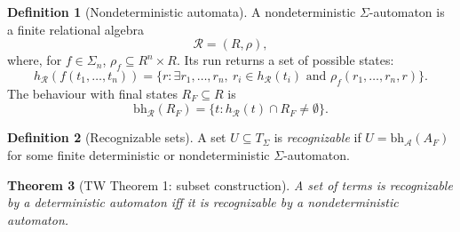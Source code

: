 \documentclass[11pt]{article}
\newtheorem{theorem}{Theorem}
\theoremstyle{definition}
\newtheorem{definition}[theorem]{Definition}
\newcommand{\SigmaSym}{\Sigma}
\newcommand{\Term}[1]{T_{#1}}
\newcommand{\Aut}{\mathcal A}
\newcommand{\NAut}{\mathcal R}
\newcommand{\bh}{\mathrm{bh}}
\begin{document}
\begin{definition}[Nondeterministic automata]
A nondeterministic \(\SigmaSym\)-automaton is a finite relational algebra
\[
  \NAut=(R,\rho),
\]
where, for \(f\in\SigmaSym_n\), \(\rho_f\subseteq R^n\times R\).  Its run returns
a set of possible states:
\[
  h_\NAut(f(t_1,\ldots,t_n))
  =
  \{r:\exists r_1,\ldots,r_n,\ r_i\in h_\NAut(t_i)
      \text{ and } \rho_f(r_1,\ldots,r_n,r)\}.
\]
The behaviour with final states \(R_F\subseteq R\) is
\[
  \bh_\NAut(R_F)=\{t:h_\NAut(t)\cap R_F\neq\emptyset\}.
\]
\end{definition}

\begin{definition}[Recognizable sets]
A set \(U\subseteq\Term{\SigmaSym}\) is \emph{recognizable} if
\(U=\bh_\Aut(A_F)\) for some finite deterministic or nondeterministic
\(\SigmaSym\)-automaton.
\end{definition}

\begin{theorem}[TW Theorem 1: subset construction]\label{thm:tw-subset}
A set of terms is recognizable by a deterministic automaton iff it is
recognizable by a nondeterministic automaton.
\end{theorem}
\end{document}
